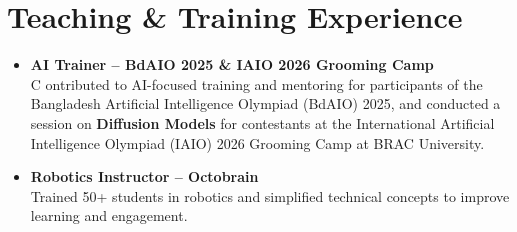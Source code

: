 \section{Teaching \& Training Experience}

\begin{itemize}

    \item \textbf{AI Trainer -- BdAIO 2025 \& IAIO 2026 Grooming Camp}\\
C   ontributed to AI-focused training and mentoring for participants of the Bangladesh Artificial Intelligence Olympiad (BdAIO) 2025, and conducted a session on \textbf{Diffusion Models} for contestants at the International Artificial Intelligence Olympiad (IAIO) 2026 Grooming Camp at BRAC University.


    \item \textbf{Robotics Instructor -- Octobrain}\\
    Trained 50+ students in robotics and simplified technical concepts to improve learning and engagement.

\end{itemize}

\endinput